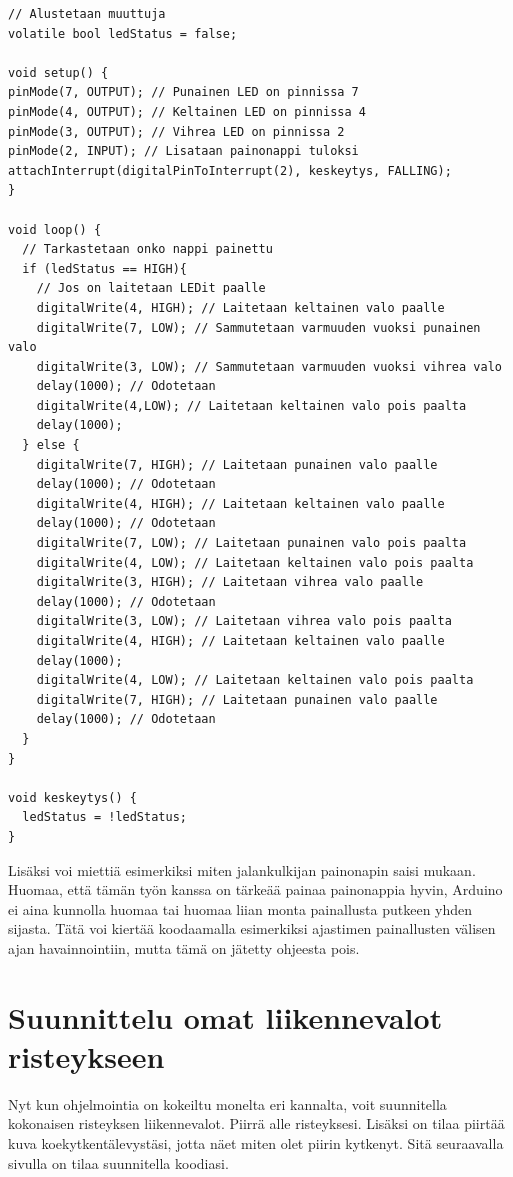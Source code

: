 \begin{tcolorbox}[colback=yellow!10, title={Koodaa!},colbacktitle=orange,breakable]
\begin{solution}
\begin{lstlisting}
// Alustetaan muuttuja
volatile bool ledStatus = false;

void setup() {
pinMode(7, OUTPUT); // Punainen LED on pinnissa 7
pinMode(4, OUTPUT); // Keltainen LED on pinnissa 4
pinMode(3, OUTPUT); // Vihrea LED on pinnissa 2
pinMode(2, INPUT); // Lisataan painonappi tuloksi
attachInterrupt(digitalPinToInterrupt(2), keskeytys, FALLING);
}

void loop() {
  // Tarkastetaan onko nappi painettu
  if (ledStatus == HIGH){
    // Jos on laitetaan LEDit paalle
    digitalWrite(4, HIGH); // Laitetaan keltainen valo paalle
    digitalWrite(7, LOW); // Sammutetaan varmuuden vuoksi punainen valo
    digitalWrite(3, LOW); // Sammutetaan varmuuden vuoksi vihrea valo
    delay(1000); // Odotetaan
    digitalWrite(4,LOW); // Laitetaan keltainen valo pois paalta
    delay(1000);
  } else {
    digitalWrite(7, HIGH); // Laitetaan punainen valo paalle
    delay(1000); // Odotetaan
    digitalWrite(4, HIGH); // Laitetaan keltainen valo paalle
    delay(1000); // Odotetaan
    digitalWrite(7, LOW); // Laitetaan punainen valo pois paalta
    digitalWrite(4, LOW); // Laitetaan keltainen valo pois paalta
    digitalWrite(3, HIGH); // Laitetaan vihrea valo paalle
    delay(1000); // Odotetaan
    digitalWrite(3, LOW); // Laitetaan vihrea valo pois paalta
    digitalWrite(4, HIGH); // Laitetaan keltainen valo paalle
    delay(1000);
    digitalWrite(4, LOW); // Laitetaan keltainen valo pois paalta
    digitalWrite(7, HIGH); // Laitetaan punainen valo paalle
    delay(1000); // Odotetaan
  }
}

void keskeytys() {
  ledStatus = !ledStatus;
}
\end{lstlisting}
Lisäksi voi miettiä esimerkiksi miten jalankulkijan painonapin saisi mukaan. Huomaa, että tämän työn kanssa on tärkeää painaa painonappia hyvin, Arduino ei aina kunnolla huomaa tai huomaa liian monta painallusta putkeen yhden sijasta. Tätä voi kiertää koodaamalla esimerkiksi ajastimen painallusten välisen ajan havainnointiin, mutta tämä on jätetty ohjeesta pois.
\end{solution}
\end{tcolorbox}

\section{Suunnittelu omat liikennevalot risteykseen}
Nyt kun ohjelmointia on kokeiltu monelta eri kannalta, voit suunnitella kokonaisen risteyksen liikennevalot. Piirrä alle risteyksesi. Lisäksi on tilaa piirtää kuva koekytkentälevystäsi, jotta näet miten olet piirin kytkenyt. Sitä seuraavalla sivulla on tilaa suunnitella koodiasi.

